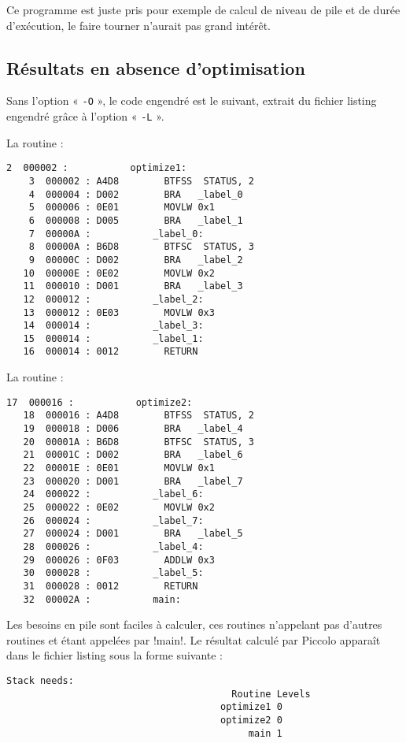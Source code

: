 Ce programme est juste pris pour exemple de calcul de niveau de pile et de durée d'exécution, le faire tourner n'aurait pas grand intérêt.

\subsection{Résultats en absence d'optimisation}

Sans l'option « \texttt{-O} », le code engendré est le suivant, extrait du fichier listing engendré grâce à l'option « \texttt{-L} ».

La routine  :

\begin{lstlisting}[language=assembleur, frame=l]
    2  000002 :           optimize1:
    3  000002 : A4D8        BTFSS  STATUS, 2
    4  000004 : D002        BRA   _label_0
    5  000006 : 0E01        MOVLW 0x1
    6  000008 : D005        BRA   _label_1
    7  00000A :           _label_0:
    8  00000A : B6D8        BTFSC  STATUS, 3
    9  00000C : D002        BRA   _label_2
   10  00000E : 0E02        MOVLW 0x2
   11  000010 : D001        BRA   _label_3
   12  000012 :           _label_2:
   13  000012 : 0E03        MOVLW 0x3
   14  000014 :           _label_3:
   15  000014 :           _label_1:
   16  000014 : 0012        RETURN
\end{lstlisting}

La routine  :

\begin{lstlisting}[language=assembleur, frame=l]
   17  000016 :           optimize2:
   18  000016 : A4D8        BTFSS  STATUS, 2
   19  000018 : D006        BRA   _label_4
   20  00001A : B6D8        BTFSC  STATUS, 3
   21  00001C : D002        BRA   _label_6
   22  00001E : 0E01        MOVLW 0x1
   23  000020 : D001        BRA   _label_7
   24  000022 :           _label_6:
   25  000022 : 0E02        MOVLW 0x2
   26  000024 :           _label_7:
   27  000024 : D001        BRA   _label_5
   28  000026 :           _label_4:
   29  000026 : 0F03        ADDLW 0x3
   30  000028 :           _label_5:
   31  000028 : 0012        RETURN
   32  00002A :           main:
\end{lstlisting}

Les besoins en pile sont faciles à calculer, ces routines n'appelant pas d'autres routines et étant appelées par \pic!main!. Le résultat calculé par Piccolo apparaît dans le fichier listing sous la forme suivante :
\begin{lstlisting}[language=assembleur, frame=l]
Stack needs:
                                        Routine Levels
                                      optimize1 0
                                      optimize2 0
                                           main 1
\end{lstlisting}

